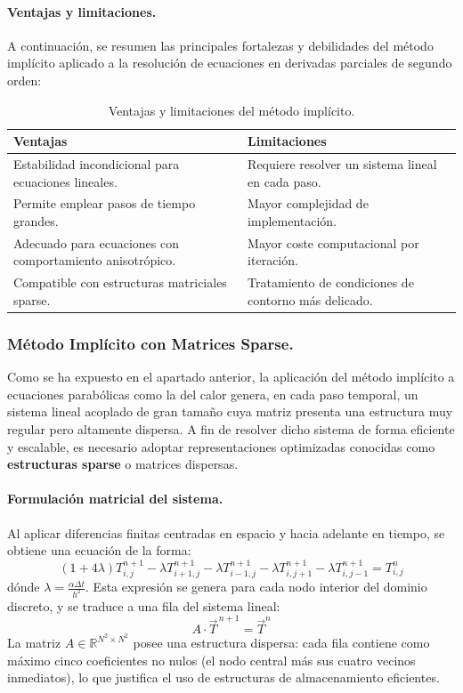 \documentclass{article}
\begin{document}
\paragraph{Ventajas y limitaciones.} A continuación, se resumen las principales fortalezas y debilidades del método implícito aplicado a la resolución de ecuaciones en derivadas parciales de segundo orden:

\begin{table}[H]
\centering
\begin{tabular}{|p{6.5cm}|p{6.5cm}|}
\hline
\textbf{Ventajas} & \textbf{Limitaciones} \\
\hline
Estabilidad incondicional para ecuaciones lineales. & Requiere resolver un sistema lineal en cada paso. \\
\hline
Permite emplear pasos de tiempo grandes. & Mayor complejidad de implementación. \\
\hline
Adecuado para ecuaciones con comportamiento anisotrópico. & Mayor coste computacional por iteración. \\
\hline
Compatible con estructuras matriciales sparse. & Tratamiento de condiciones de contorno más delicado. \\
\hline
\end{tabular}
\caption{Ventajas y limitaciones del método implícito.}
\end{table}

\newpage
\subsubsection{Método Implícito con Matrices Sparse.}
\label{subsubsec:sparse}
Como se ha expuesto en el apartado anterior, la aplicación del método implícito a ecuaciones parabólicas como la del calor genera, en cada paso temporal, un sistema lineal acoplado de gran tamaño cuya matriz presenta una estructura muy regular pero altamente dispersa. A fin de resolver dicho sistema de forma eficiente y escalable, es necesario adoptar representaciones optimizadas conocidas como \textbf{estructuras sparse} o matrices dispersas.

\paragraph{Formulación matricial del sistema.}

Al aplicar diferencias finitas centradas en espacio y hacia adelante en tiempo, se obtiene una ecuación de la forma:
$$
(1 + 4\lambda) T_{i,j}^{n+1}
- \lambda T_{i+1,j}^{n+1}
- \lambda T_{i-1,j}^{n+1}
- \lambda T_{i,j+1}^{n+1}
- \lambda T_{i,j-1}^{n+1}
= T_{i,j}^{n}
$$
dónde $\lambda = \frac{\alpha \Delta t}{h^2}$. Esta expresión se genera para cada nodo interior del dominio discreto, y se traduce a una fila del sistema lineal:
$$
A \cdot \vec{T}^{\,n+1} = \vec{T}^n
$$
La matriz $A \in \mathbb{R}^{N^2 \times N^2}$ posee una estructura dispersa: cada fila contiene como máximo cinco coeficientes no nulos (el nodo central más sus cuatro vecinos inmediatos), lo que justifica el uso de estructuras de almacenamiento eficientes.
\end{document}
